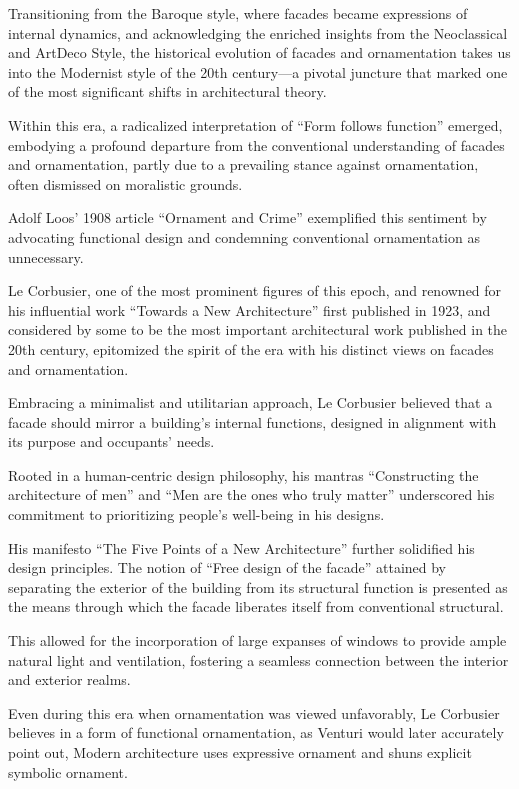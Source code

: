 Transitioning from the Baroque style, where facades became expressions of internal dynamics, and acknowledging the enriched insights from the Neoclassical and ArtDeco Style,  the historical evolution of facades and ornamentation takes us into the Modernist style of the 20th century—a pivotal juncture that marked one of the most significant shifts in architectural theory.

 Within this era, a radicalized interpretation of ``Form follows function'' emerged, embodying a profound departure from the conventional understanding of facades and ornamentation, partly due to a prevailing stance against ornamentation, often dismissed on moralistic grounds.

Adolf Loos' 1908 article ``Ornament and Crime'' exemplified this sentiment by advocating functional design and condemning conventional ornamentation as unnecessary\cite{Saglam2014}.

Le Corbusier, one of the most prominent figures of this epoch, and renowned for his influential work ``Towards a New Architecture'' first published in 1923, and considered by some to be the most important architectural work published in the 20th century, epitomized the spirit of the era with his distinct views on facades and ornamentation\cite{Studio2a2023}.

Embracing a minimalist and utilitarian approach, Le Corbusier believed that a facade should mirror a building's internal functions, designed in alignment with its purpose and occupants' needs.

Rooted in a human-centric design philosophy, his mantras ``Constructing the architecture of men'' and ``Men are the ones who truly matter'' underscored his commitment to prioritizing people's well-being in his designs\cite{Virseda2021}.

His manifesto ``The Five Points of a New Architecture'' further solidified his design principles.
The notion of ``Free design of the facade'' attained by separating the exterior of the building from its structural function is presented as the means through which the facade liberates itself from conventional structural\cite{Corbusier1986}.

This allowed for the incorporation of large expanses of windows to provide ample natural light and ventilation, fostering a seamless connection between the interior and exterior realms.

Even during this era when ornamentation was viewed unfavorably, Le Corbusier believes in a form of functional ornamentation, as Venturi\cite{Venturi1972} would later accurately point out, Modern architecture uses expressive ornament and shuns explicit symbolic  ornament.


